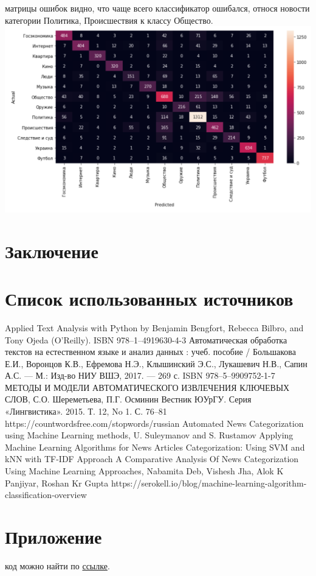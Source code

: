\documentclass{article}
\newcommand\tab[1][1cm]{\hspace*{#1}}
\begin{document}
 матрицы ошибок видно, что чаще всего классификатор ошибался, относя новости категории Политика, Происшествия к классу Общество. 
\includegraphics[scale=0.8]{f14.png}\\
\newpage
{}
\section*{Заключение}
\newpage
{}
\section*{Список использованных источников}
\renewcommand{\refname}{}
\begin{thebibliography}{7}
 Applied Text Analysis with Python by Benjamin Bengfort, Rebecca Bilbro, and Tony Ojeda (O’Reilly). ISBN 978­–1­–491­9630-4­-3
 Автоматическая обработка текстов на естественном языке и анализ данных : учеб. пособие / Большакова Е.И., Воронцов К.В., Ефремова Н.Э., Клышинский Э.С., Лукашевич Н.В., Сапин А.С. — М.: Изд-во НИУ ВШЭ, 2017. — 269 с. ISBN 978–5–9909752-1-7
МЕТОДЫ И МОДЕЛИ АВТОМАТИЧЕСКОГО ИЗВЛЕЧЕНИЯ КЛЮЧЕВЫХ СЛОВ, С.О. Шереметьева, П.Г. Осминин Вестник ЮУрГУ. Серия «Лингвистика». 2015. Т. 12, No 1. С. 76–81
https://countwordsfree.com/stopwords/russian
Automated News Categorization using Machine Learning methods, U. Suleymanov and S. Rustamov
Applying Machine Learning Algorithms for News Articles Categorization: Using SVM and kNN with TF-IDF Approach
A Comparative Analysis Of News Categorization Using Machine Learning Approaches, Nabamita Deb, Vishesh Jha, Alok K Panjiyar, Roshan Kr Gupta
https://serokell.io/blog/machine-learning-algorithm-classification-overview
\end{thebibliography}
\newpage
{}
\section*{Приложение}
 код можно найти по \href{https://github.com/dokapoka/paper_text_classification}{ссылке}.

 
\end{document}
